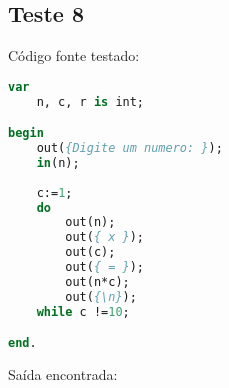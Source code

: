 \documentclass[11pt]{article}
\begin{document}
\subsection{Teste 8}

Código fonte testado:
\begin{lstlisting}[language=Pascal]
var
    n, c, r is int;

begin
    out({Digite um numero: });
    in(n);
    
    c:=1;
    do
        out(n);
        out({ x });
        out(c);
        out({ = });
        out(n*c);
        out({\n});
    while c !=10;

end.
\end{lstlisting}
	
Saída encontrada:
\begin{verbatim}
	
\end{verbatim}
\end{document}
